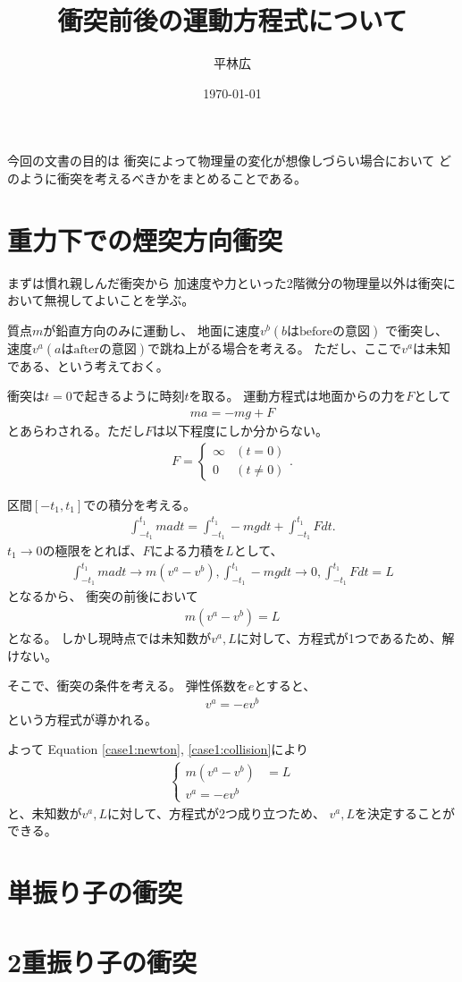 \documentclass[a4paper,11pt]{jsarticle}
\begin{document}
\title{衝突前後の運動方程式について}
\author{平林広}
\date{\today}
\maketitle

今回の文書の目的は
衝突によって物理量の変化が想像しづらい場合において
どのように衝突を考えるべきかをまとめることである。

\section{重力下での煙突方向衝突}
まずは慣れ親しんだ衝突から
加速度や力といった2階微分の物理量以外は衝突において無視してよいことを学ぶ。

質点$m$が鉛直方向のみに運動し、
地面に速度$v^b (b\text{はbeforeの意図})$ で衝突し、
速度$v^a (a\text{はafterの意図})$で跳ね上がる場合を考える。
ただし、ここで$v^a$は未知である、という考えておく。

衝突は$t=0$で起きるように時刻$t$を取る。
運動方程式は地面からの力を$F$として
\begin{align*}
  m a = -mg + F
\end{align*}
とあらわされる。ただし$F$は以下程度にしか分からない。
\begin{align*}
  F = \begin{cases}
    \infty & (t = 0)
    \\
    0 & (t \neq 0)
  \end{cases}
  .
\end{align*}

区間$[-t_1, t_1]$での積分を考える。
\begin{align*}
  \int_{-t_1}^{t_1} m a dt = \int_{-t_1}^{t_1} -mg dt + \int_{-t_1}^{t_1} F dt
  .
\end{align*}
$t_1 \rightarrow 0$の極限をとれば、$F$による力積を$L$として、
\begin{gather*}
  \int_{-t_1}^{t_1} m a dt \rightarrow m(v^a - v^b),
  \int_{-t_1}^{t_1} -mg dt \rightarrow 0,
  \int_{-t_1}^{t_1} F dt = L
\end{gather*}
となるから、
衝突の前後において
\begin{gather}
  m(v^a - v^b) = L
  \label{case1:newton}
\end{gather}
となる。
しかし現時点では未知数が$v^a, L$に対して、方程式が1つであるため、解けない。

そこで、衝突の条件を考える。
弾性係数を$e$とすると、
\begin{gather}
  v^a = -e v^b
  \label{case1:collision}
\end{gather}
という方程式が導かれる。

よって Equation \ref{case1:newton}, \ref{case1:collision}により
\begin{align*}
  \begin{cases}
    m(v^a - v^b) &= L
    \\
    v^a = -e v^b
  \end{cases}
\end{align*}
と、未知数が$v^a, L$に対して、方程式が2つ成り立つため、
$v^a, L$を決定することができる。

\section{単振り子の衝突}

\section{2重振り子の衝突}
\end{document}
